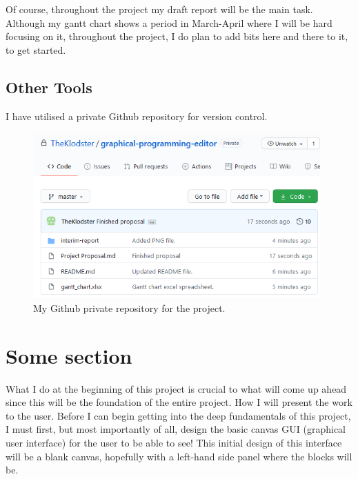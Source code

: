\documentclass[a4paper, 12pt]{article}
\begin{document}
            Of course, throughout the project my draft report will be the main task. Although
            my gantt chart shows a period in March-April where I will be hard focusing on it,
            throughout the project, I do plan to add bits here and there to it, to get started.

        \subsection{Other Tools}
            I have utilised a private Github repository for version control.

            \begin{figure}[h]
                \centering
                \includegraphics[width=110mm]{github.png}
                \caption{My Github private repository for the project.}
            \end{figure}
    
    \clearpage
    \section{Some section}
    What I do at the beginning of this project is crucial to what will come up ahead since this
    will be the foundation of the entire project. How I will present the work to the user. Before
    I can begin getting into the deep fundamentals of this project, I must first, but most
    importantly of all, design the basic canvas GUI (graphical user interface) for the user to
    be able to see! This initial design of this interface will be a blank canvas, hopefully
    with a left-hand side panel where the blocks will be.
\end{document}
